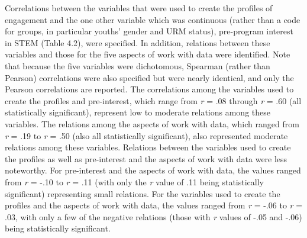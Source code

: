 \documentclass[]{book}
\theoremstyle{definition}
\theoremstyle{definition}
\theoremstyle{definition}
\theoremstyle{remark}
\begin{document}
Correlations between the variables that were used to create the profiles
of engagement and the one other variable which was continuous (rather
than a code for groups, in particular youths' gender and URM status),
pre-program interest in STEM (Table 4.2), were specified. In addition,
relations between these variables and those for the five aspects of work
with data were identified. Note that because the five variables were
dichotomous, Spearman (rather than Pearson) correlations were also
specified but were nearly identical, and only the Pearson correlations
are reported. The correlations among the variables used to create the
profiles and pre-interest, which range from \emph{r} = .08 through
\emph{r} = .60 (all statistically significant), represent low to
moderate relations among these variables. The relations among the
aspects of work with data, which ranged from \emph{r} = .19 to \emph{r}
= .50 (also all statistically significant), also represented moderate
relations among these variables. Relations between the variables used to
create the profiles as well as pre-interest and the aspects of work with
data were less noteworthy. For pre-interest and the aspects of work with
data, the values ranged from \emph{r} = -.10 to \emph{r} = .11 (with
only the \emph{r} value of .11 being statistically significant)
representing small relations. For the variables used to create the
profiles and the aspects of work with data, the values ranged from
\emph{r} = -.06 to \emph{r} = .03, with only a few of the negative
relations (those with \emph{r} values of -.05 and -.06) being
statistically significant.
\end{document}

